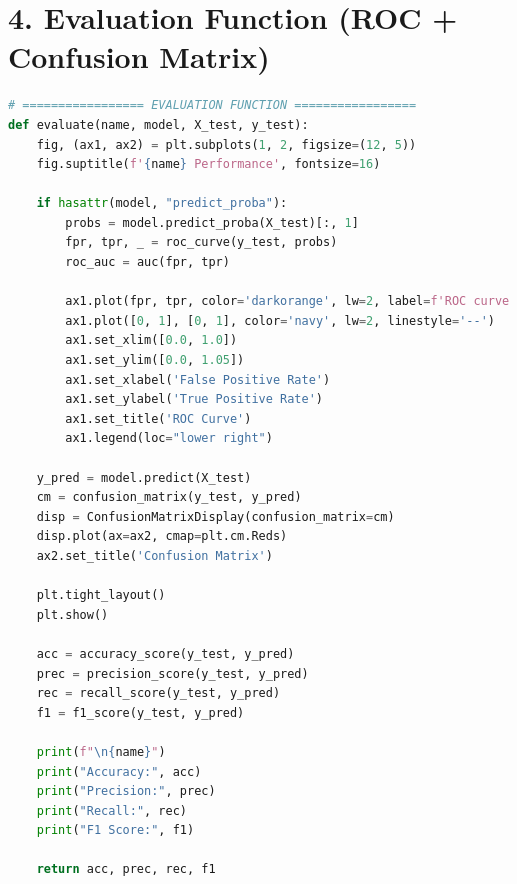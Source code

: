 \documentclass[12pt]{article}
\begin{document}
\section*{4. Evaluation Function (ROC + Confusion Matrix)}
\begin{lstlisting}[language=Python]
# ================= EVALUATION FUNCTION =================
def evaluate(name, model, X_test, y_test):
    fig, (ax1, ax2) = plt.subplots(1, 2, figsize=(12, 5))
    fig.suptitle(f'{name} Performance', fontsize=16)

    if hasattr(model, "predict_proba"):
        probs = model.predict_proba(X_test)[:, 1]
        fpr, tpr, _ = roc_curve(y_test, probs)
        roc_auc = auc(fpr, tpr)

        ax1.plot(fpr, tpr, color='darkorange', lw=2, label=f'ROC curve (AUC = {roc_auc:.2f})')
        ax1.plot([0, 1], [0, 1], color='navy', lw=2, linestyle='--')
        ax1.set_xlim([0.0, 1.0])
        ax1.set_ylim([0.0, 1.05])
        ax1.set_xlabel('False Positive Rate')
        ax1.set_ylabel('True Positive Rate')
        ax1.set_title('ROC Curve')
        ax1.legend(loc="lower right")

    y_pred = model.predict(X_test)
    cm = confusion_matrix(y_test, y_pred)
    disp = ConfusionMatrixDisplay(confusion_matrix=cm)
    disp.plot(ax=ax2, cmap=plt.cm.Reds)
    ax2.set_title('Confusion Matrix')

    plt.tight_layout()
    plt.show()

    acc = accuracy_score(y_test, y_pred)
    prec = precision_score(y_test, y_pred)
    rec = recall_score(y_test, y_pred)
    f1 = f1_score(y_test, y_pred)

    print(f"\n{name}")
    print("Accuracy:", acc)
    print("Precision:", prec)
    print("Recall:", rec)
    print("F1 Score:", f1)

    return acc, prec, rec, f1
\end{lstlisting}
\end{document}
